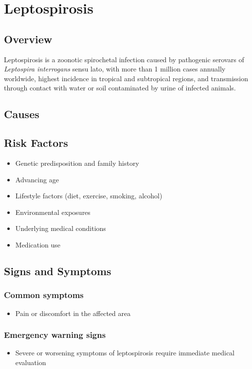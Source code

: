 \chapter{Leptospirosis}
\label{sec:Leptospirosis}

\section{Overview}
Leptospirosis is a zoonotic spirochetal infection caused by pathogenic serovars of \textit{Leptospira interrogans} sensu lato, with more than 1 million cases annually worldwide, highest incidence in tropical and subtropical regions, and transmission through contact with water or soil contaminated by urine of infected animals.
\section{Causes}
\section{Risk Factors}

\begin{itemize}[noitemsep]
  \item Genetic predisposition and family history
  \item Advancing age
  \item Lifestyle factors (diet, exercise, smoking, alcohol)
  \item Environmental exposures
  \item Underlying medical conditions
  \item Medication use
\end{itemize}
\section{Signs and Symptoms}

\subsection{Common symptoms}
\begin{itemize}[noitemsep]
  \item Pain or discomfort in the affected area
  \end{itemize}

\subsection{Emergency warning signs}
\begin{itemize}[noitemsep]
  \item Severe or worsening symptoms of leptospirosis require immediate medical evaluation
\end{itemize}
